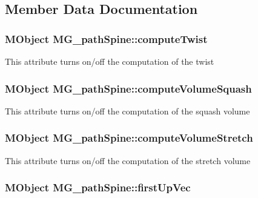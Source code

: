 \subsection{Member Data Documentation}
\hypertarget{class_m_g__path_spine_a61634d056e477a73db2a5c5bcfacec0a}{
\subsubsection[{compute\-Twist}]{\setlength{\rightskip}{0pt plus 5cm}M\-Object M\-G\-\_\-path\-Spine\-::compute\-Twist\hspace{0.3cm}{\ttfamily [static]}}}\label{class_m_g__path_spine_a61634d056e477a73db2a5c5bcfacec0a}
This attribute turns on/off the computation of the twist \hypertarget{class_m_g__path_spine_a388952b4b3257d4ba2c7becb63a60061}{
\subsubsection[{compute\-Volume\-Squash}]{\setlength{\rightskip}{0pt plus 5cm}M\-Object M\-G\-\_\-path\-Spine\-::compute\-Volume\-Squash\hspace{0.3cm}{\ttfamily [static]}}}\label{class_m_g__path_spine_a388952b4b3257d4ba2c7becb63a60061}
This attribute turns on/off the computation of the squash volume \hypertarget{class_m_g__path_spine_ae23dd8337d46df00656630b0461c28df}{
\subsubsection[{compute\-Volume\-Stretch}]{\setlength{\rightskip}{0pt plus 5cm}M\-Object M\-G\-\_\-path\-Spine\-::compute\-Volume\-Stretch\hspace{0.3cm}{\ttfamily [static]}}}\label{class_m_g__path_spine_ae23dd8337d46df00656630b0461c28df}
This attribute turns on/off the computation of the stretch volume \hypertarget{class_m_g__path_spine_afc674fb8cad25f40d47c292696b1737d}{
\subsubsection[{first\-Up\-Vec}]{\setlength{\rightskip}{0pt plus 5cm}M\-Object M\-G\-\_\-path\-Spine\-::first\-Up\-Vec\hspace{0.3cm}{\ttfamily [static]}}}\label{class_m_g__path_spine_afc674fb8cad25f40d47c292696b1737d}
